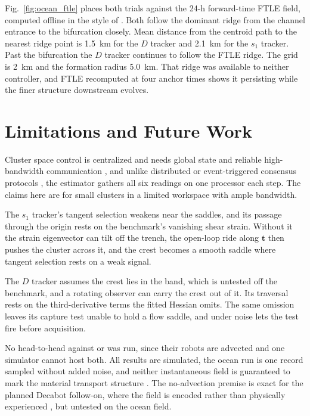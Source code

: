 \documentclass[lettersize,journal]{IEEEtran}
\begin{document}
Fig.~\ref{fig:ocean_ftle} places both trials against the 24-h forward-time
FTLE field, computed offline in the style of \cite{17}. Both follow the
dominant ridge from the channel entrance to the bifurcation closely. Mean
distance from the centroid path to the nearest ridge point
is 1.5~km for the $D$ tracker and 2.1~km for the $s_1$ tracker. Past the
bifurcation the $D$ tracker continues to follow the FTLE ridge. The grid is
2~km and the formation radius 5.0~km. That ridge was available to neither controller,
and FTLE recomputed at four anchor times shows it persisting while the
finer structure downstream evolves.

\section{Limitations and Future Work}
\label{sec:disc_limits}

Cluster space control is centralized and needs global state and reliable
high-bandwidth communication \cite{30}, and unlike distributed or
event-triggered consensus protocols \cite{35}, the estimator gathers all six
readings on one processor each step. The claims here are for small clusters
in a limited workspace with ample bandwidth.

The $s_1$ tracker's tangent selection weakens near the saddles, and its
passage through the origin rests on the benchmark's vanishing shear
strain. Without it the strain eigenvector
can tilt off the trench, the open-loop ride along $\mathbf{t}$ then
pushes the cluster across it, and the crest becomes a smooth saddle where
tangent selection rests on a weak signal.

The $D$ tracker assumes the crest lies in the band, which is untested off
the benchmark, and a rotating observer can carry the crest out of it. Its
traversal rests on the third-derivative terms the fitted Hessian omits.
The same omission leaves its capture test unable to hold a flow saddle,
and under noise lets the test fire before acquisition.

No head-to-head against \cite{26,27,28} or \cite{29} was run, since
their robots are advected and one simulator cannot host both. All results
are simulated, the ocean run is one record sampled without added noise,
and neither instantaneous field is guaranteed to mark the material
transport structure \cite{18}. The no-advection premise is exact for the
planned Decabot follow-on, where the field is encoded rather than
physically experienced \cite{32}, but untested on the ocean field.
\end{document}
